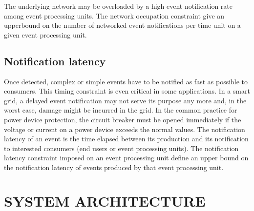 \documentclass[a4paper,twoside]{article}
\begin{document}
The underlying network may be overloaded by a high event notification rate among event processing units.  
The network occupation constraint give an upperbound on the number of networked event notifications per time unit on a given event processing unit.  
\subsection{Notification latency}
Once detected, complex or simple events have to be notified as fast as possible to consumers. This timing constraint is even critical in some applications. In a smart grid, a delayed event notification may not serve its purpose any more and, in the worst case, damage might be incurred in the grid. In the common practice for power device protection, the circuit breaker must be opened immediately if the voltage or current on a power device exceeds the normal values. The notification latency of an event is the time elapsed between its production and its notification to interested consumers (end users or event processing units). The notification latency constraint imposed on an event processing unit define an upper bound on the notification latency of events produced by that event processing unit.

\section{\uppercase{System Architecture}}
\label{sec:architecture}
\end{document}
